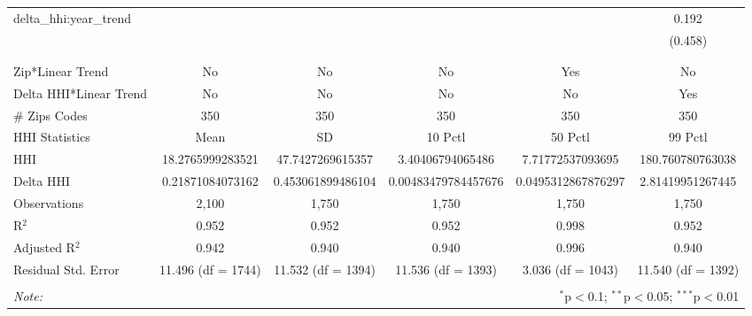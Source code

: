 \begin{table}[H]
{\begin{tabular}{@{\extracolsep{5pt}}lccccc}
  delta\_hhi:year\_trend &  &  &  &  & 0.192 \\  

   &  &  &  &  & (0.458) \\  

   & & & & & \\  

 \hline \\[-1.8ex]  

 Zip*Linear Trend & No & No & No & Yes & No \\  

 Delta HHI*Linear Trend & No & No & No & No & Yes \\  

 # Zips Codes & 350 & 350 & 350 & 350 & 350 \\  

 HHI Statistics & Mean & SD & 10 Pctl & 50 Pctl & 99 Pctl \\  

 HHI & 18.2765999283521 & 47.7427269615357 & 3.40406794065486 & 7.71772537093695 & 180.760780763038 \\  

 Delta HHI & 0.21871084073162 & 0.453061899486104 & 0.00483479784457676 & 0.0495312867876297 & 2.81419951267445 \\  

 Observations & 2,100 & 1,750 & 1,750 & 1,750 & 1,750 \\  

 R$^{2}$ & 0.952 & 0.952 & 0.952 & 0.998 & 0.952 \\  

 Adjusted R$^{2}$ & 0.942 & 0.940 & 0.940 & 0.996 & 0.940 \\  

 Residual Std. Error & 11.496 (df = 1744) & 11.532 (df = 1394) & 11.536 (df = 1393) & 3.036 (df = 1043) & 11.540 (df = 1392) \\  

 \hline  

 \hline \\[-1.8ex]  

 \textit{Note:}  & \multicolumn{5}{r}{$^{*}$p$<$0.1; $^{**}$p$<$0.05; $^{***}$p$<$0.01} \\  

 \end{tabular}}  

 \end{table}  

 


